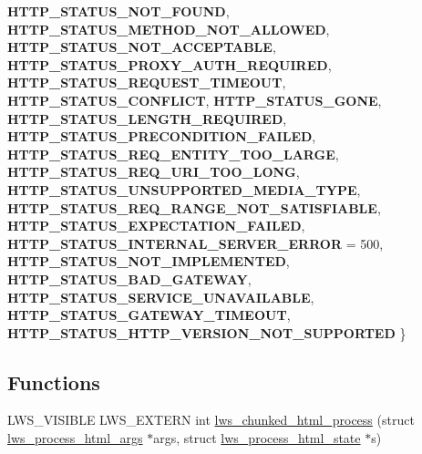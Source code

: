\begin{DoxyCompactItemize}
\newline
{\bfseries H\+T\+T\+P\+\_\+\+S\+T\+A\+T\+U\+S\+\_\+\+N\+O\+T\+\_\+\+F\+O\+U\+ND}, 
{\bfseries H\+T\+T\+P\+\_\+\+S\+T\+A\+T\+U\+S\+\_\+\+M\+E\+T\+H\+O\+D\+\_\+\+N\+O\+T\+\_\+\+A\+L\+L\+O\+W\+ED}, 
{\bfseries H\+T\+T\+P\+\_\+\+S\+T\+A\+T\+U\+S\+\_\+\+N\+O\+T\+\_\+\+A\+C\+C\+E\+P\+T\+A\+B\+LE}, 
{\bfseries H\+T\+T\+P\+\_\+\+S\+T\+A\+T\+U\+S\+\_\+\+P\+R\+O\+X\+Y\+\_\+\+A\+U\+T\+H\+\_\+\+R\+E\+Q\+U\+I\+R\+ED}, 
\newline
{\bfseries H\+T\+T\+P\+\_\+\+S\+T\+A\+T\+U\+S\+\_\+\+R\+E\+Q\+U\+E\+S\+T\+\_\+\+T\+I\+M\+E\+O\+UT}, 
{\bfseries H\+T\+T\+P\+\_\+\+S\+T\+A\+T\+U\+S\+\_\+\+C\+O\+N\+F\+L\+I\+CT}, 
{\bfseries H\+T\+T\+P\+\_\+\+S\+T\+A\+T\+U\+S\+\_\+\+G\+O\+NE}, 
{\bfseries H\+T\+T\+P\+\_\+\+S\+T\+A\+T\+U\+S\+\_\+\+L\+E\+N\+G\+T\+H\+\_\+\+R\+E\+Q\+U\+I\+R\+ED}, 
\newline
{\bfseries H\+T\+T\+P\+\_\+\+S\+T\+A\+T\+U\+S\+\_\+\+P\+R\+E\+C\+O\+N\+D\+I\+T\+I\+O\+N\+\_\+\+F\+A\+I\+L\+ED}, 
{\bfseries H\+T\+T\+P\+\_\+\+S\+T\+A\+T\+U\+S\+\_\+\+R\+E\+Q\+\_\+\+E\+N\+T\+I\+T\+Y\+\_\+\+T\+O\+O\+\_\+\+L\+A\+R\+GE}, 
{\bfseries H\+T\+T\+P\+\_\+\+S\+T\+A\+T\+U\+S\+\_\+\+R\+E\+Q\+\_\+\+U\+R\+I\+\_\+\+T\+O\+O\+\_\+\+L\+O\+NG}, 
{\bfseries H\+T\+T\+P\+\_\+\+S\+T\+A\+T\+U\+S\+\_\+\+U\+N\+S\+U\+P\+P\+O\+R\+T\+E\+D\+\_\+\+M\+E\+D\+I\+A\+\_\+\+T\+Y\+PE}, 
\newline
{\bfseries H\+T\+T\+P\+\_\+\+S\+T\+A\+T\+U\+S\+\_\+\+R\+E\+Q\+\_\+\+R\+A\+N\+G\+E\+\_\+\+N\+O\+T\+\_\+\+S\+A\+T\+I\+S\+F\+I\+A\+B\+LE}, 
{\bfseries H\+T\+T\+P\+\_\+\+S\+T\+A\+T\+U\+S\+\_\+\+E\+X\+P\+E\+C\+T\+A\+T\+I\+O\+N\+\_\+\+F\+A\+I\+L\+ED}, 
{\bfseries H\+T\+T\+P\+\_\+\+S\+T\+A\+T\+U\+S\+\_\+\+I\+N\+T\+E\+R\+N\+A\+L\+\_\+\+S\+E\+R\+V\+E\+R\+\_\+\+E\+R\+R\+OR} = 500, 
{\bfseries H\+T\+T\+P\+\_\+\+S\+T\+A\+T\+U\+S\+\_\+\+N\+O\+T\+\_\+\+I\+M\+P\+L\+E\+M\+E\+N\+T\+ED}, 
\newline
{\bfseries H\+T\+T\+P\+\_\+\+S\+T\+A\+T\+U\+S\+\_\+\+B\+A\+D\+\_\+\+G\+A\+T\+E\+W\+AY}, 
{\bfseries H\+T\+T\+P\+\_\+\+S\+T\+A\+T\+U\+S\+\_\+\+S\+E\+R\+V\+I\+C\+E\+\_\+\+U\+N\+A\+V\+A\+I\+L\+A\+B\+LE}, 
{\bfseries H\+T\+T\+P\+\_\+\+S\+T\+A\+T\+U\+S\+\_\+\+G\+A\+T\+E\+W\+A\+Y\+\_\+\+T\+I\+M\+E\+O\+UT}, 
{\bfseries H\+T\+T\+P\+\_\+\+S\+T\+A\+T\+U\+S\+\_\+\+H\+T\+T\+P\+\_\+\+V\+E\+R\+S\+I\+O\+N\+\_\+\+N\+O\+T\+\_\+\+S\+U\+P\+P\+O\+R\+T\+ED}
 \}
\end{DoxyCompactItemize}
\subsection*{Functions}
\begin{DoxyCompactItemize}
\item 
L\+W\+S\+\_\+\+V\+I\+S\+I\+B\+LE L\+W\+S\+\_\+\+E\+X\+T\+E\+RN int \hyperlink{group__html-chunked-substitution_ga643073f918c0a7016b690aae9793fd60}{lws\+\_\+chunked\+\_\+html\+\_\+process} (struct \hyperlink{structlws__process__html__args}{lws\+\_\+process\+\_\+html\+\_\+args} $\ast$args, struct \hyperlink{structlws__process__html__state}{lws\+\_\+process\+\_\+html\+\_\+state} $\ast$s)
\end{DoxyCompactItemize}



